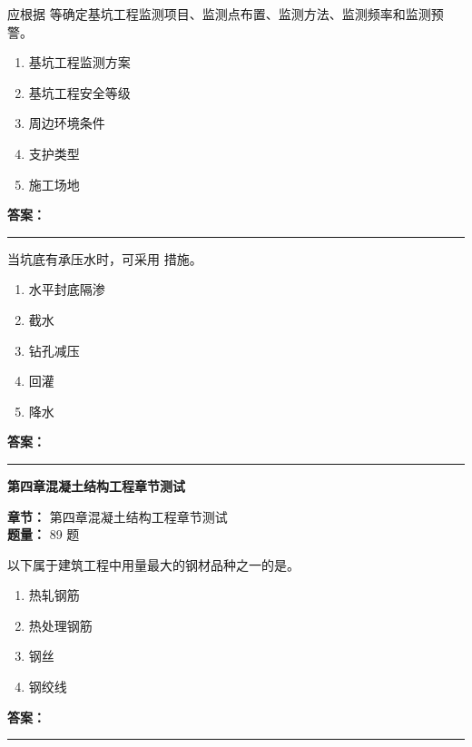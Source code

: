 \documentclass[UTF8,fontset=fandol,11pt]{ctexart}
\newcommand{\chaptertitle}[1]{\vspace{0.5em}\begin{tcolorbox}[enhanced,colback=deepblue,colframe=deepblue,arc=2mm,boxrule=0pt]\begin{center}\Large\bfseries\color{white}#1\end{center}\end{tcolorbox}\vspace{0.5em}}
\newcommand{\answerline}{\textcolor{answerred}{\rule{2.4cm}{0.7pt}}}
\begin{document}
\vspace{0.2em}

\begin{quizbox}[title={第 22 题}]
应根据 等确定基坑工程监测项目、监测点布置、监测方法、监测频率和监测预警。\\
\begin{enumerate}[label=\Alph*.]
\item 基坑工程监测方案
\item 基坑工程安全等级
\item 周边环境条件
\item 支护类型
\item 施工场地
\end{enumerate}
\textbf{\textcolor{answerred}{答案：}} \answerline
\end{quizbox}

\vspace{0.2em}

\begin{quizbox}[title={第 23 题}]
当坑底有承压水时，可采用 措施。\\
\begin{enumerate}[label=\Alph*.]
\item 水平封底隔渗
\item 截水
\item 钻孔减压
\item 回灌
\item 降水
\end{enumerate}
\textbf{\textcolor{answerred}{答案：}} \answerline
\end{quizbox}

\vspace{0.2em}

\chaptertitle{第四章混凝土结构工程章节测试}
\begin{mainbox}
\textbf{\textcolor{mainblue}{章节：}} 第四章混凝土结构工程章节测试\\
\textbf{\textcolor{answerred}{题量：}} 89 题
\end{mainbox}

\begin{quizbox}[title={第 1 题}]
以下属于建筑工程中用量最大的钢材品种之一的是。\\
\begin{enumerate}[label=\Alph*.]
\item 热轧钢筋
\item 热处理钢筋
\item 钢丝
\item 钢绞线
\end{enumerate}
\textbf{\textcolor{answerred}{答案：}} \answerline
\end{quizbox}
\end{document}
